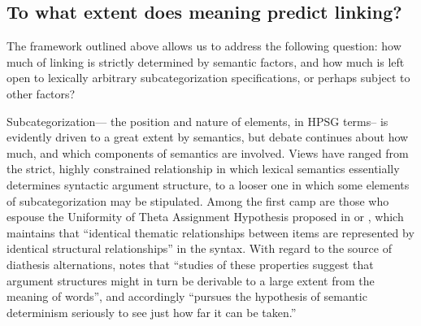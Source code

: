 \documentclass[output=paper]{langsci/langscibook}
\begin{document}
\subsection{To what extent does meaning predict linking?}


The framework outlined above allows us to address the following question: how much of linking is strictly determined by semantic factors, and how much is left open to 
lexically arbitrary subcategorization specifications, or perhaps subject to other factors?

Subcategorization--- the position and nature of \argst elements, in HPSG terms-- is evidently driven to a great extent by semantics,
but debate continues about how much, and which components of semantics are involved.
Views have ranged from the strict, highly constrained relationship in which lexical semantics essentially determines syntactic argument structure, to a looser one in which some elements of subcategorization may be stipulated.
Among  the first camp are those who espouse the Uniformity of Theta Assignment Hypothesis  proposed in \citet[46]{Baker1988} or \citet{Baker1997}, which maintains that ``identical thematic relationships between items are represented by identical structural relationships'' in the syntax.
With regard to the source of diathesis alternations, \citet[12-13]{Levin1993} notes that ``studies of these properties suggest that argument structures might in turn be derivable to a large extent from the meaning of words'', and accordingly ``pursues the hypothesis of semantic determinism seriously to see just how far it can be taken.''
\end{document}
